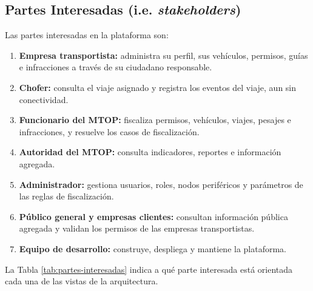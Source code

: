 \subsection{Partes Interesadas (i.e. \textit{stakeholders})}

Las partes interesadas en la plataforma \solucion son:

\begin{enumerate}
    \item \textbf{Empresa transportista:} administra su perfil, sus vehículos, permisos, guías e infracciones a través de su ciudadano responsable.
    \item \textbf{Chofer:} consulta el viaje asignado y registra los eventos del viaje, aun sin conectividad.
    \item \textbf{Funcionario del MTOP:} fiscaliza permisos, vehículos, viajes, pesajes e infracciones, y resuelve los casos de fiscalización.
    \item \textbf{Autoridad del MTOP:} consulta indicadores, reportes e información agregada.
    \item \textbf{Administrador:} gestiona usuarios, roles, nodos periféricos y parámetros de las reglas de fiscalización.
    \item \textbf{Público general y empresas clientes:} consultan información pública agregada y validan los permisos de las empresas transportistas.
    \item \textbf{Equipo de desarrollo:} construye, despliega y mantiene la plataforma.
\end{enumerate}

La Tabla \ref{tab:partes-interesadas} indica a qué parte interesada está orientada cada una de las vistas de la arquitectura.

